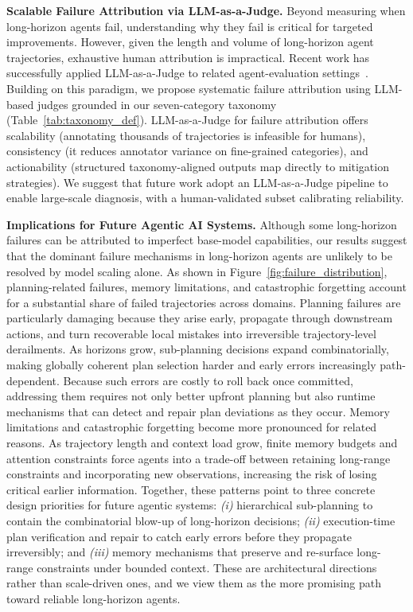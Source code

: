 \documentclass[11pt]{article}
\begin{document}
\textbf{Scalable Failure Attribution via LLM-as-a-Judge.}
Beyond measuring when long-horizon agents fail, understanding why they fail is critical for targeted improvements. However, given the length and volume of long-horizon agent trajectories, exhaustive human attribution is impractical. Recent work has successfully applied LLM-as-a-Judge to related agent-evaluation settings~\citep{zheng2023judging, kapoor2025holistic}. Building on this paradigm, we propose systematic failure attribution using LLM-based judges grounded in our seven-category taxonomy (Table~\ref{tab:taxonomy_def}).
LLM-as-a-Judge for failure attribution offers scalability (annotating thousands of trajectories is infeasible for humans), consistency (it reduces annotator variance on fine-grained categories), and actionability (structured taxonomy-aligned outputs map directly to mitigation strategies). 
We suggest that future work adopt an LLM-as-a-Judge pipeline to enable large-scale diagnosis, with a human-validated subset calibrating reliability.

\textbf{Implications for Future Agentic AI Systems.}
Although some long-horizon failures can be attributed to imperfect base-model capabilities, our results suggest that the dominant failure mechanisms in long-horizon agents are unlikely to be resolved by model scaling alone. As shown in Figure~\ref{fig:failure_distribution}, planning-related failures, memory limitations, and catastrophic forgetting account for a substantial share of failed trajectories across domains.
Planning failures are particularly damaging because they arise early, propagate through downstream actions, and turn recoverable local mistakes into irreversible trajectory-level derailments. As horizons grow, sub-planning decisions expand combinatorially, making globally coherent plan selection harder and early errors increasingly path-dependent. Because such errors are costly to roll back once committed, addressing them requires not only better upfront planning but also runtime mechanisms that can detect and repair plan deviations as they occur.
Memory limitations and catastrophic forgetting become more pronounced for related reasons. As trajectory length and context load grow, finite memory budgets and attention constraints force agents into a trade-off between retaining long-range constraints and incorporating new observations, increasing the risk of losing critical earlier information.
Together, these patterns point to three concrete design priorities for future agentic systems: \textit{(i)} hierarchical sub-planning to contain the combinatorial blow-up of long-horizon decisions; \textit{(ii)} execution-time plan verification and repair to catch early errors before they propagate irreversibly; and \textit{(iii)} memory mechanisms that preserve and re-surface long-range constraints under bounded context. These are architectural directions rather than scale-driven ones, and we view them as the more promising path toward reliable long-horizon agents.
\end{document}
